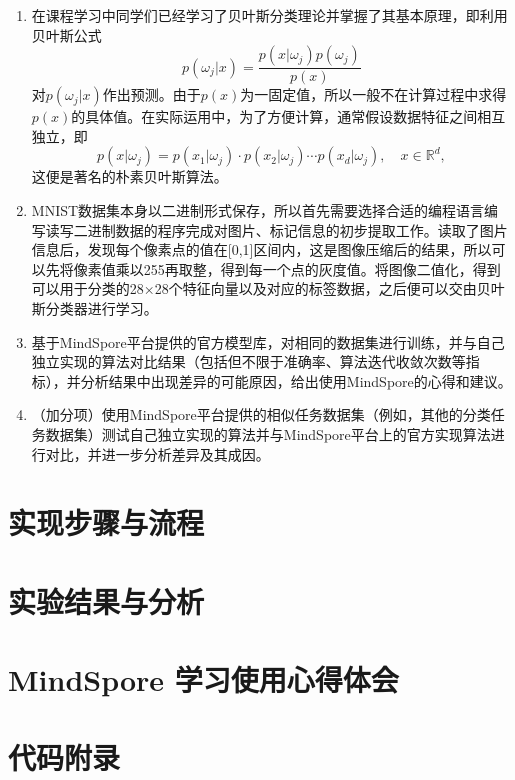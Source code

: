 \documentclass[12pt]{article}
\begin{document}
\begin{enumerate}
  \item 在课程学习中同学们已经学习了贝叶斯分类理论并掌握了其基本原理，即利用贝叶斯公式
        \[
          p(\omega_j|x) = \frac{p(x|\omega_j)p(\omega_j)}{p(x)}
        \]
        对\(p(\omega_j|x)\)作出预测。由于\(p(x)\)为一固定值，所以一般不在计算过程中求得\(p(x)\)的具体值。在实际运用中，为了方便计算，通常假设数据特征之间相互独立，即
        \[
          p(x|\omega_j) = p(x_1|\omega_j) \cdot p(x_2|\omega_j) \cdots p(x_d|\omega_j), \quad x \in \mathbb{R}^d,
        \]
        这便是著名的朴素贝叶斯算法。

  \item MNIST数据集本身以二进制形式保存，所以首先需要选择合适的编程语言编写读写二进制数据的程序完成对图片、标记信息的初步提取工作。读取了图片信息后，发现每个像素点的值在[0,1]区间内，这是图像压缩后的结果，所以可以先将像素值乘以255再取整，得到每一个点的灰度值。将图像二值化，得到可以用于分类的28×28个特征向量以及对应的标签数据，之后便可以交由贝叶斯分类器进行学习。

  \item 基于MindSpore平台提供的官方模型库，对相同的数据集进行训练，并与自己独立实现的算法对比结果（包括但不限于准确率、算法迭代收敛次数等指标），并分析结果中出现差异的可能原因，给出使用MindSpore的心得和建议。

  \item （加分项）使用MindSpore平台提供的相似任务数据集（例如，其他的分类任务数据集）测试自己独立实现的算法并与MindSpore平台上的官方实现算法进行对比，并进一步分析差异及其成因。
\end{enumerate}

\section{实现步骤与流程}



\section{实验结果与分析}

\section{MindSpore 学习使用心得体会}

\section{代码附录}
\end{document}
